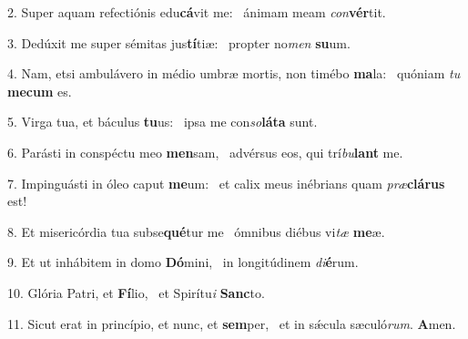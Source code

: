 2. Super aquam refectiónis edu\textbf{cá}vit me: \ast\  ánimam meam \textit{con}\textbf{vér}tit.\

3. Dedúxit me super sémitas jus\textbf{tí}tiæ: \ast\  propter no\textit{men} \textbf{su}um.\

4. Nam, etsi ambulávero in médio umbræ mortis, non timébo \textbf{ma}la: \ast\  quóniam \textit{tu} \textbf{me}\textbf{cum} es.\

5. Virga tua, et báculus \textbf{tu}us: \ast\  ipsa me con\textit{so}\textbf{lá}\textbf{ta} sunt.\

6. Parásti in conspéctu meo \textbf{men}sam, \ast\  advérsus eos, qui trí\textit{bu}\textbf{lant} me.\

7. Impinguásti in óleo caput \textbf{me}um: \ast\  et calix meus inébrians quam \textit{præ}\textbf{clá}\textbf{rus} est!\

8. Et misericórdia tua subse\textbf{qué}tur me \ast\  ómnibus diébus vi\textit{tæ} \textbf{me}æ.\

9. Et ut inhábitem in domo \textbf{Dó}mini, \ast\  in longitúdinem \textit{di}\textbf{é}rum.\

10. Glória Patri, et \textbf{Fí}lio, \ast\  et Spirítu\textit{i} \textbf{Sanc}to.\

11. Sicut erat in princípio, et nunc, et \textbf{sem}per, \ast\  et in sǽcula sæculó\textit{rum}. \textbf{A}men.\

